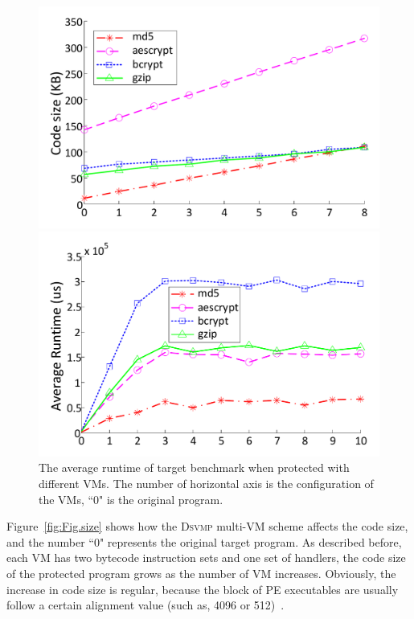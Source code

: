 \documentclass[preprint,12pt,3p]{elsarticle}
\newcommand{\DSVMP}{\textsc{Dsvmp}\xspace}
\begin{document}
\begin{figure}[t]
\centering
\begin{minipage}[t]{0.49\linewidth}
\centering
\includegraphics[width=.9\textwidth]{figure/codesize.pdf}
\caption{The impact of code sizes for \DSVMP configurations with a different number of VMs. The number of horizontal axis is the configuration of the VMs, ``0" is the original program.}\label{fig:Fig.size}
\end{minipage}
\hspace{0.005\textwidth}
\begin{minipage}[t]{0.49\linewidth}
\centering
\includegraphics[width=.9\textwidth]{figure/runtime.pdf}
\caption{The average runtime of target benchmark when protected with different VMs. The number of horizontal axis is the configuration of the VMs, ``0" is the original program.}\label{fig:Fig.time}
\end{minipage}
\end{figure}


Figure~\ref{fig:Fig.size} shows how the \DSVMP multi-VM scheme affects the code size,
and the number ``0" represents the original target program.
As described before, each VM has two bytecode instruction sets and one set of handlers,
the code size of the protected program grows as the number of VM increases.
Obviously, the increase in code size is regular, because the block of PE executables
are usually follow a certain alignment value (such as, 4096 or 512)~\cite{pe}.
\end{document}
